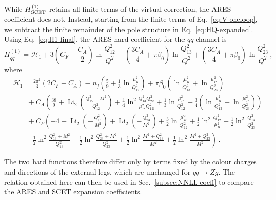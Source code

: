 While $H^{(1)}_{\rm SCET}$ retains all finite terms of the virtual correction,
the \textsc{ARES} coefficient does not. Instead, starting from the finite
terms of Eq.~\eqref{eq:V-oneloop}, we subtract the finite remainder of the
pole structure in Eq.~\eqref{eq:HQ-expanded}. Using Eq.~\eqref{eq:H1-final},
the \textsc{ARES} hard coefficient for the $q\bar{q}$ channel is
\begin{equation}
H_{q\bar{q}}^{(1)}=\mathcal{H}_1
+3\left(C_F-\frac{C_A}{2}\right)\ln\frac{Q_{12}^2}{Q^2}
+\left(\frac{3C_A}{4}+\pi\beta_0\right)\ln\frac{Q_{13}^2}{Q^2}
+\left(\frac{3C_A}{4}+\pi\beta_0\right)\ln\frac{Q_{23}^2}{Q^2}\,,
\end{equation}
where
\begin{equation}
\label{eq:H1-ARES}
\begin{aligned}
&\mathcal{H}_1=\frac{2\pi^2}{3}\left(2C_F-C_A\right)
-n_f\left(\frac{5}{9}+\frac{1}{3}\ln\frac{\mu_R^2}{Q_{12}^2}\right)
+\pi\beta_0\left(\ln\frac{\mu_R^2}{Q_{13}^2}+\ln\frac{\mu_R^2}{Q_{23}^2}\right)\\[0.5ex]
&\qquad+C_A\left(\frac{38}{9}
+\operatorname{Li}_2\left(\frac{Q_{12}^2-M^2}{Q_{12}^2}\right)
+\frac{1}{4}\ln^2\frac{Q_{13}^2Q_{23}^2}{\mu_R^2\,Q_{12}^2}
+\frac{1}{3}\ln\frac{\mu_R^2}{Q_{12}^2}+\frac{3}{4}\left(\ln\frac{\mu_R^2}{Q_{13}^2}
+\ln\frac{\mu_R^2}{Q_{23}^2}\right)\right)\\[0.5ex]
&\qquad+C_F\left(-4
+\operatorname{Li}_2\left(-\frac{Q_{13}^2}{M^2}\right)
+\operatorname{Li}_2\left(-\frac{Q_{23}^2}{M^2}\right)
+\frac{3}{2}\ln\frac{\mu_R^2}{Q_{12}^2}+\frac{1}{2}\ln^2\frac{Q_{12}^2}{\mu_R^2}
+\frac{1}{2}\ln^2\frac{Q_{13}^2}{Q_{23}^2}\right.\\[0.5ex]
&\qquad\left.-\frac{1}{2}\ln^2\frac{Q_{13}^2+M^2}{Q_{13}^2}
-\frac{1}{2}\ln^2\frac{Q_{23}^2+M^2}{Q_{23}^2}+\frac{1}{2}\ln^2\frac{M^2+Q_{13}^2}{M^2}
+\frac{1}{2}\ln^2\frac{M^2+Q_{23}^2}{M^2}\right)\,.
\end{aligned}
\end{equation}

The two hard functions therefore differ only by terms fixed by the colour
charges and directions of the external legs, which are unchanged for
$q\bar q\to Zg$. The relation obtained here can then be used in
Sec.~\ref{subsec:NNLL-coeff} to compare the \textsc{ARES} and SCET expansion
coefficients.